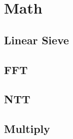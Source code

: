 \section{Math}

\subsection{Linear Sieve}


\subsection{FFT}



\subsection{NTT}



\subsection{Multiply}



